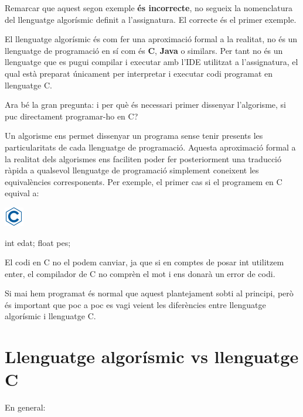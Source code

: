 \documentclass[]{book}
\newenvironment{Shaded}{\begin{snugshade}}{\end{snugshade}}
\newcommand{\DataTypeTok}[1]{\textcolor[rgb]{0.13,0.29,0.53}{#1}}
\newcommand{\NormalTok}[1]{#1}
\begin{document}
Remarcar que aquest segon exemple \textbf{és incorrecte}, no segueix la
nomenclatura del llenguatge algorísmic definit a l'assignatura. El
correcte és el primer exemple.

El llenguatge algorísmic és com fer una aproximació formal a la
realitat, no és un llenguatge de programació en sí com és \textbf{C},
\textbf{Java} o similars. Per tant no és un llenguatge que es pugui
compilar i executar amb l'IDE utilitzat a l'assignatura, el qual està
preparat únicament per interpretar i executar codi programat en
llenguatge C.

Ara bé la gran pregunta: i per què és necessari primer dissenyar
l'algorisme, si puc directament programar-ho en C?

Un algorisme ens permet dissenyar un programa sense tenir presents les
particularitats de cada llenguatge de programació. Aquesta aproximació
formal a la realitat dels algorismes ens faciliten poder fer
posteriorment una traducció ràpida a qualsevol llenguatge de programació
simplement coneixent les equivalències corresponents. Per exemple, el
primer cas si el programem en C equival a:

\includegraphics{./img/c.png}

\begin{Shaded}
\begin{Highlighting}[]
\DataTypeTok{int}\NormalTok{ edat;}
\DataTypeTok{float}\NormalTok{ pes;}
\end{Highlighting}
\end{Shaded}

El codi en C no el podem canviar, ja que si en comptes de posar int
utilitzem enter, el compilador de C no comprèn el mot i ens donarà un
error de codi.

Si mai hem programat és normal que aquest plantejament sobti al
principi, però és important que poc a poc es vagi veient les diferències
entre llenguatge algorísmic i llenguatge C.

\section{Llenguatge algorísmic vs llenguatge
C}\label{llenguatge-algorismic-vs-llenguatge-c}

En general:
\end{document}
